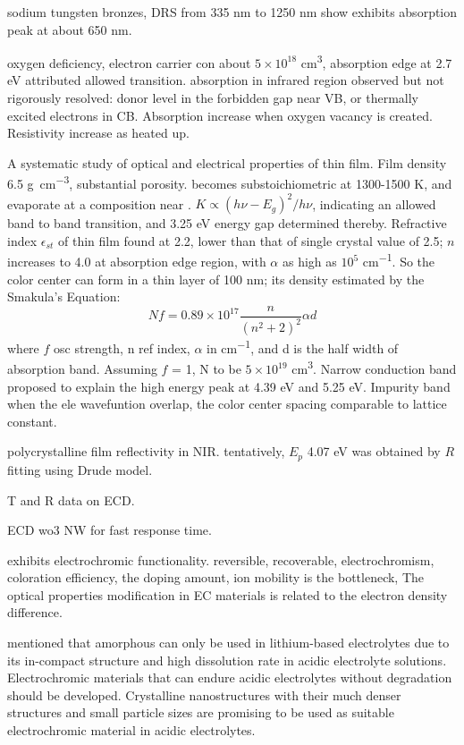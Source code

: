 sodium tungsten bronzes, DRS from 335 nm to 1250 nm show  exhibits absorption peak at about 650 nm.\cite{Brown1954} 

oxygen deficiency, electron carrier con about $5\times10^{18}$ \si{cm^3}, absorption edge at 2.7 eV attributed allowed transition. absorption in infrared region observed but not rigorously resolved: donor level in the forbidden gap near VB, or thermally excited electrons in CB. Absorption increase when oxygen vacancy is created. Resistivity increase as heated up. \cite{Berak1970}

A systematic study of optical and electrical properties of  thin film.\cite{Deb1973} Film density 6.5 \si{g\per cm^3}, substantial porosity.  becomes substoichiometric at 1300-1500 K, and evaporate at a composition near . $K \propto (h\nu - E_g)^2/h\nu$, indicating an allowed band to band transition, and 3.25 eV energy gap determined thereby. Refractive index $\epsilon_{st}$ of thin film  found at 2.2, lower than that of single crystal value of 2.5; $n$ increases to 4.0 at absorption edge region, with $\alpha$ as high as $10^5$ \si{cm^{-1}}. So the color center can form in a thin layer of 100 nm; its density estimated by the Smakula's Equation:
\[
Nf = 0.89\times10^17\frac{n}{(n^2+2)^2} \alpha d
\]
where $f$ osc strength, n ref index, $\alpha$ in \si{cm^{-1}}, and d is the half width of absorption band. Assuming $f$ = 1, N to be $5\times10^{19}$ \si{cm^3}. 
Narrow conduction band proposed to explain the high energy peak at 4.39 eV and 5.25 eV. Impurity band when the ele wavefuntion overlap, the color center spacing comparable to lattice constant. 


polycrystalline  film reflectivity in NIR.\cite{Goldner1983} tentatively,  $E_p$ 4.07 eV was obtained by $R$ fitting using Drude model. 

T and R data on ECD. \cite{OBrien1999}

ECD wo3 NW for fast response time. \cite{Liao2006a}


exhibits electrochromic functionality. reversible, recoverable, electrochromism, 
coloration efficiency, the doping amount, 
ion mobility is the bottleneck, 
The optical properties modification in EC materials is related to the electron density difference. 


\citeauthor{Wang2009a} mentioned that amorphous  can only be used in lithium-based electrolytes due to its in-compact structure and high dissolution rate in acidic electrolyte solutions. Electrochromic materials that can endure acidic electrolytes without degradation should be developed. Crystalline  nanostructures with their much denser structures and small particle sizes are promising to be used as suitable electrochromic material in acidic electrolytes.

